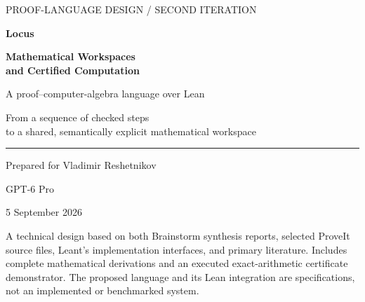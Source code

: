 \documentclass[11pt,letterpaper]{article}
\theoremstyle{definition}
\theoremstyle{remark}
\begin{document}
\begin{titlepage}
\color{ink}
{\sffamily\large PROOF-LANGUAGE DESIGN \quad / \quad SECOND ITERATION\par}
\vspace{1.05in}
{\sffamily\bfseries\fontsize{35}{40}\selectfont Locus\par}
\vspace{.18in}
{\sffamily\bfseries\fontsize{25}{30}\selectfont Mathematical Workspaces\\and Certified Computation\par}
\vspace{.4in}
{\sffamily\Large A proof--computer-algebra language over Lean\par}
\vspace{.4in}
{\large From a sequence of checked steps\\to a shared, semantically explicit mathematical workspace\par}
\vfill
\rule{\textwidth}{.8pt}
\vspace{.2in}
Prepared for Vladimir Reshetnikov\par
GPT-6 Pro\par
5 September 2026\par
\vspace{.25in}
{\small A technical design based on both Brainstorm synthesis reports, selected
ProveIt source files, Leant's implementation interfaces, and primary literature.
Includes complete mathematical derivations and an executed exact-arithmetic
certificate demonstrator. The proposed language and its Lean integration are
specifications, not an implemented or benchmarked system.}
\end{titlepage}
\end{document}
